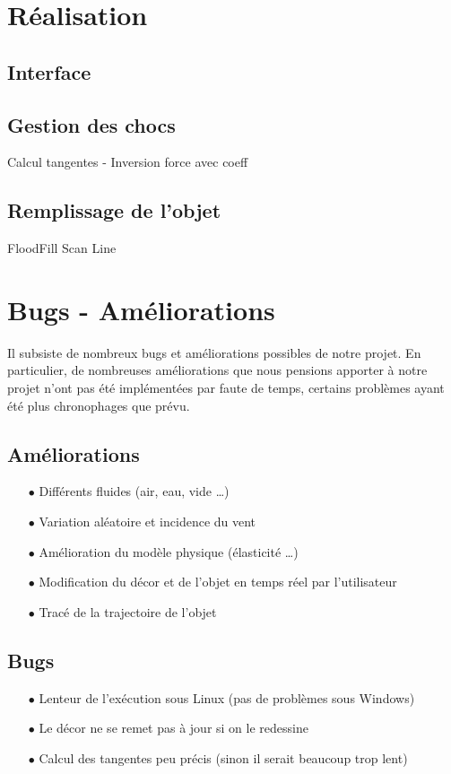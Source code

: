 \section{Réalisation}
\subsection{Interface}
\subsection{Gestion des chocs}
Calcul tangentes - Inversion force avec coeff
\subsection{Remplissage de l'objet}
FloodFill Scan Line


\section{Bugs - Améliorations}
Il subsiste de nombreux bugs et améliorations possibles de notre projet.
En particulier, de nombreuses améliorations que nous pensions apporter
à notre projet n'ont pas été implémentées par faute de temps, certains 
problèmes ayant été plus chronophages que prévu.
\subsection{Améliorations}
\begin{itemize}
\item[$\bullet$] Différents fluides (air, eau, vide \dots)
\item[$\bullet$] Variation aléatoire et incidence du vent 
\item[$\bullet$] Amélioration du modèle physique (élasticité \dots )
\item[$\bullet$] Modification du décor et de l'objet en temps réel par l'utilisateur
\item[$\bullet$] Tracé de la trajectoire de l'objet
\end{itemize}
\subsection{Bugs}
\begin{itemize}
\item[$\bullet$] Lenteur de l'exécution sous Linux (pas de problèmes sous Windows)
\item[$\bullet$] Le décor ne se remet pas à jour si on le redessine
\item[$\bullet$] Calcul des tangentes peu précis (sinon il serait beaucoup trop lent)
\end{itemize}
